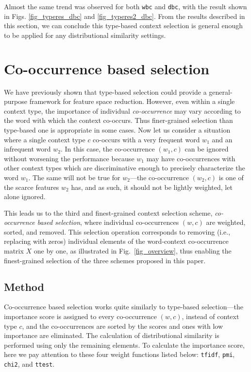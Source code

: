 \documentclass[english]{jnlp_1.4}
\begin{document}
Almost the same trend was observed for both {\tt wbc} and {\tt dbc},
with the result shown in Figs. \ref{fig_typeres_dbc} and
\ref{fig_typeres2_dbc}.  From the results described in this section,
we can conclude this type-based context selection is general enough to
be applied for any distributional similarity settings.

\section{Co-occurrence based selection}

We have previously shown that type-based selection could provide a
general-purpose framework for feature space reduction. However, even
within a single context type, the importance of individual {\em
co-occurrence} may vary according to the word with which the context
co-occurs. Thus finer-grained selection than type-based one is
appropriate in some cases. Now let us consider a situation where a
single context type $c$ co-occurs with a very frequent word $w_1$ and
an infrequent word $w_2$. In this case, the co-occurrence $(w_1, c)$
can be ignored without worsening the performance because $w_1$ may
have co-occurrences with other context types which are discriminative
enough to precisely characterize the word $w_1$. The same will not be
true for $w_2$---the co-occurrence $(w_2, c)$ is one of the scarce
features $w_2$ has, and as such, it should not be lightly weighted,
let alone ignored.

This leads us to the third and finest-grained context selection
scheme, {\em co-occurrence based selection}, where individual
co-occurrences $(w,c)$ are weighted, sorted, and removed.  This
selection operation corresponds to removing (i.e., replacing with
zeros) individual elements of the word-context co-occurrence matrix
$X$ one by one, as illustrated in Fig.~\ref{fig_overview}, thus
enabling the finest-grained selection of the three schemes proposed in
this paper.

\subsection{Method}

Co-occurrence based selection works quite similarly to type-based
selection---the importance score is assigned to every co-occurrence
$(w,c)$, instead of context type $c$, and the co-occurrences are
sorted by the scores and ones with low importance are eliminated. The
calculation of distributional similarity is performed using only the
remaining elements.  To calculate the importance score, here we pay
attention to these four weight functions listed below: {\tt tfidf},
{\tt pmi}, {\tt chi2}, and {\tt ttest}.
\end{document}
